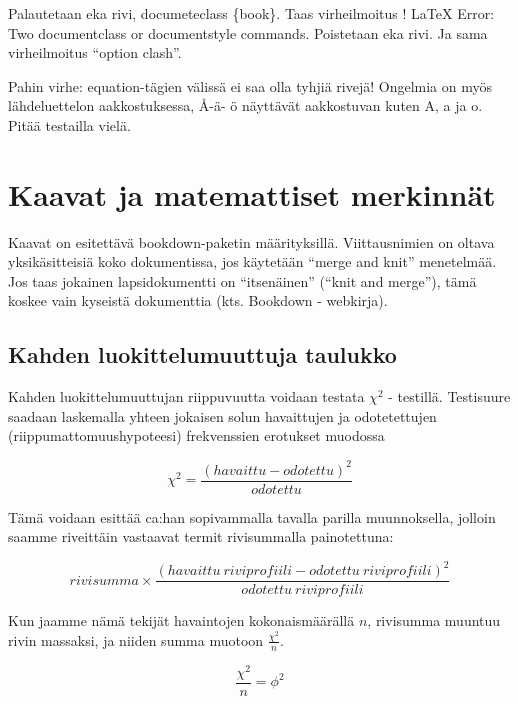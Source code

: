\documentclass[finnish,]{book}
\theoremstyle{definition}
\theoremstyle{definition}
\theoremstyle{definition}
\theoremstyle{remark}
\begin{document}
Palautetaan eka rivi, documeteclass \{book\}. Taas virheilmoitus ! LaTeX
Error: Two documentclass or documentstyle commands. Poistetaan eka rivi.
Ja sama virheilmoitus ``option clash''.

Pahin virhe: equation-tägien välissä ei saa olla tyhjiä rivejä! Ongelmia
on myös lähdeluettelon aakkostuksessa, Å-ä- ö näyttävät aakkostuvan
kuten A, a ja o. Pitää testailla vielä.

\hypertarget{kaavat-ja-matemattiset-merkinnat}{%
\chapter{Kaavat ja matemattiset
merkinnät}\label{kaavat-ja-matemattiset-merkinnat}}

Kaavat on esitettävä bookdown-paketin määrityksillä. Viittausnimien on
oltava yksikäsitteisiä koko dokumentissa, jos käytetään ``merge and
knit'' menetelmää. Jos taas jokainen lapsidokumentti on ``itsenäinen''
(``knit and merge''), tämä koskee vain kyseistä dokumenttia (kts.
Bookdown - webkirja).

\hypertarget{kahden-luokittelumuuttuja-taulukko}{%
\section{Kahden luokittelumuuttuja
taulukko}\label{kahden-luokittelumuuttuja-taulukko}}

Kahden luokittelumuuttujan riippuvuutta voidaan testata \(\chi^{2}\) -
testillä. Testisuure saadaan laskemalla yhteen jokaisen solun
havaittujen ja odotetettujen (riippumattomuushypoteesi) frekvenssien
erotukset muodossa

\begin{equation}
  \chi^{2} = \frac{(havaittu - odotettu)^2} {odotettu}
  \label{eq:khii21}
\end{equation}

Tämä voidaan esittää ca:han sopivammalla tavalla parilla muunnoksella,
jolloin saamme riveittäin vastaavat termit rivisummalla painotettuna:

\begin{equation}
  rivisumma \times \frac{(havaittu \: riviprofiili - odotettu \: riviprofiili)^2} {odotettu \: riviprofiili}
  \label{eq:khii22}
\end{equation}

Kun jaamme nämä tekijät havaintojen kokonaismäärällä \(n\), rivisumma
muuntuu rivin massaksi, ja niiden summa muotoon \(\frac{\chi^{2}}{n}\).

\begin{equation}
 \frac{\chi^{2}}{n} = \phi^{2}
 \label{eq:inert1}
\end{equation}
\end{document}
